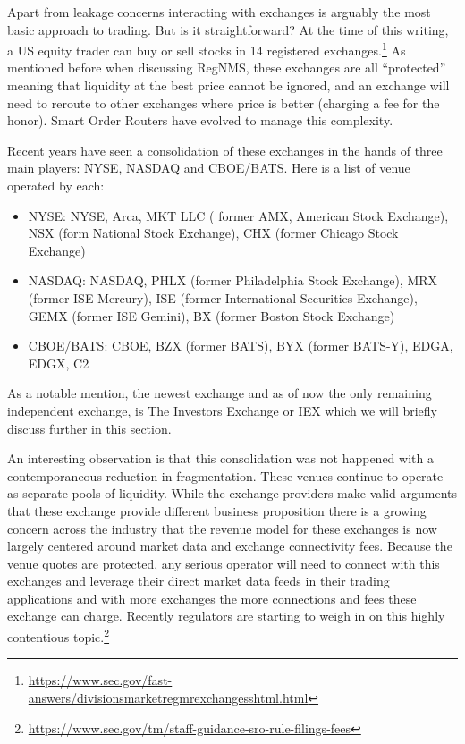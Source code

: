 Apart from leakage concerns interacting with exchanges is arguably the most basic approach to trading. But is it straightforward? At the time of this writing, a US equity trader can buy or sell stocks in 14 registered exchanges.\footnote{\url{https://www.sec.gov/fast-answers/divisionsmarketregmrexchangesshtml.html}} As mentioned before when discussing RegNMS, these exchanges are all ``protected'' meaning that liquidity at the best price cannot be ignored, and an exchange will need to reroute to other exchanges where price is better (charging a fee for the honor). Smart Order Routers have evolved to manage this complexity.

Recent years have seen a consolidation of these exchanges in the hands of three main players: NYSE, NASDAQ and CBOE/BATS. Here is a list of venue operated by each:
        \begin{itemize}
        \item NYSE: NYSE, Arca, MKT LLC ( former AMX, American Stock Exchange), NSX (form National Stock Exchange), CHX (former Chicago Stock Exchange)
        \item NASDAQ:  NASDAQ, PHLX (former Philadelphia Stock Exchange), MRX (former ISE Mercury), ISE (former International Securities Exchange), GEMX (former ISE Gemini), BX (former Boston Stock Exchange)
        \item CBOE/BATS: CBOE, BZX (former BATS), BYX (former BATS-Y), EDGA, EDGX, C2
        \end{itemize}
As a notable mention, the newest exchange and as of now the only remaining independent exchange, is The Investors Exchange or IEX which we will briefly discuss further in this section.

An interesting observation is that this consolidation was not happened with a contemporaneous reduction in fragmentation. These venues continue to operate as separate pools of liquidity. While the exchange providers make valid arguments that these exchange provide different business proposition there is a growing concern across the industry that the revenue model for these exchanges is now largely centered around market data and exchange connectivity fees. Because the venue quotes are protected, any serious operator will need to connect with this exchanges and leverage their direct market data feeds in their trading applications and with more exchanges the more connections and fees these exchange can charge. Recently regulators are starting to weigh in on this highly contentious topic.\footnote{\url{https://www.sec.gov/tm/staff-guidance-sro-rule-filings-fees}}

